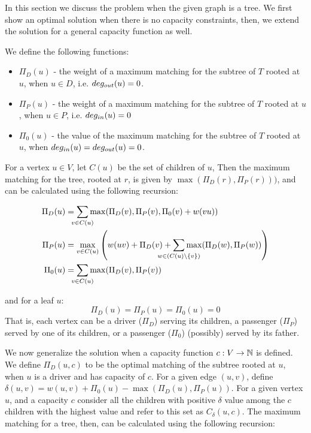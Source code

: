 \label{sec:carpool:trees}

\def\Md{\Pi_D}
\def\Mp{\Pi_P}
\def\M0{\Pi_0}

In this section we discuss the problem when the given graph is a tree.
We first show an optimal solution when there is no capacity constraints, 
then, we extend the solution for a general capacity function as well.

We define the following functions:
\begin{itemize}
\item 
$\Md(u)$ - the weight of a maximum matching for the subtree of $T$ rooted at $u$,
when $u \in D$, i.e. $deg_{out}(u) = 0$.

\item
$\Mp(u)$ - the weight of a maximum matching for the subtree of $T$ rooted at
$u$, when $u \in P$, i.e. $deg_{in}(u) = 0$ 

\item
$\M0(u)$ - the value of the maximum matching for the subtree of $T$ rooted at
$u$, when $deg_{in}(u) = deg_{out}(u) = 0$.
\end{itemize}
%
For a vertex $u \in V$, let $C(u)$ be the set of children of $u$,
Then the maximum matching for the tree, rooted at $r$,
is given by $\max{(\Md(r), \Mp(r)))}$, 
and can be calculated using the following recursion:

\begin{align*}
\Md(u)		& = \smashoperator{\sum_{v \in C(u)}}
				{\max(\Md(v), \Mp(v), \M0(v) + w(vu))}
\\
\Mp(u) 		& = \max_{v \in C(u)}{\left(
				w(uv) +
				\Md(v) +
				\smashoperator{\sum_{w \in (C(u) \setminus \{v\})}}{\max (\Md(w), \Mp(w))}
				\right)}
\\
\M0(u) 		& =  \smashoperator{\sum_{v \in C(u)}}{\max (\Md(v), \Mp(v))}
\end{align*}

and for a leaf $u$:
$$ \Md(u) = \Mp(u) = \M0(u) = 0 $$
%
That is, each vertex can be a driver ($\Md$) serving its children, 
a passenger ($\Mp$) served by one of its children, 
or a passenger ($\M0$) (possibly) served by its father.
  
We now generalize the solution when a capacity function 
$c : V \rightarrow \mathbb{N}$ is defined.
We define $\Md(u, c)$ to be the
optimal matching of the subtree rooted at $u$, when $u$ is a driver and has
capacity of $c$.
For a given edge $(u, v)$, 
define $\delta(u, v) = w(u, v) + \M0(u) - \max (\Md(u), \Mp(u))$.
For a given vertex $u$, and a capacity $c$ 
consider all the children with positive $\delta$ value among the $c$
children with the highest value and refer to this set as $C_\delta(u, c)$. 
The maximum matching for a tree, then, can be calculated using the
following recursion:

